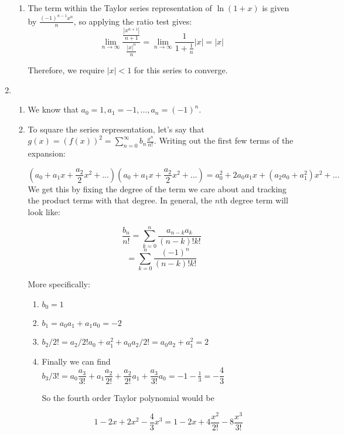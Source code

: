 \begin{enumerate}
\begin{enumerate}
                \item The term within the Taylor series representation of $\ln(1+x)$ is given by $\frac{(-1)^{n-1}x^n}{n}$, so applying the ratio test gives:
                \[\lim_{n\to\infty}\frac{\frac{|x^{n+1}|}{n+1}}{\frac{|x|^n}{n}} = \lim_{n\to\infty}\frac{1}{1+\frac{1}{n}}|x| = |x|\]
                
                Therefore, we require $|x| < 1$ for this series to converge.
            \end{enumerate}
            
            \item 
            \begin{enumerate}
                \item We know that $a_0 = 1, a_1 = -1, ..., a_n = (-1)^n$.
                
                
                \item To square the series representation, let's say that $g(x) = (f(x))^2=\sum_{n=0}^\infty b_n \frac{x^n}{n!}$. Writing out the first few terms of the expansion:

                \[(a_0 + a_1x + \frac{a_2}{2}x^2 +...)(a_0 + a_1x + \frac{a_2}{2}x^2 +...) = a_0^2 + 2a_0a_1x + (a_2a_0 +a_1^2)x^2 + ...\]
                We get this by fixing the degree of the term we care about and tracking the product terms with that degree. 
                In general, the $n$th degree term will look like:

                \[\frac{b_n}{n!} = \sum_{k=0}^n \frac{a_{n-k}a_k}{(n-k)!k!}\]
                \[ = \sum_{k=0}^n \frac{(-1)^n}{(n-k)!k!}\]

                
                More specifically:

                \begin{enumerate}
                    \item $b_0 = 1$
                    \item $b_1 = a_0a_1 + a_1 a_0 = -2$
                    \item $b_2/2! = a_2/2!a_0 + a_1^2 + a_0a_2/2! = a_0a_2 + a_1^2 = 2$
                    \item Finally we can find $b_3/3! = a_0\dfrac{a_3}{3!} + a_1 \dfrac{a_2}{2!} + \dfrac{a_2}{2!}a_1 + \dfrac{a_3}{3!}a_0 = -1-\frac{1}{3} = -\dfrac{4}{3}$

                    So the fourth order Taylor polynomial would be

                    \[1 -2x +2x^2 -\dfrac{4}{3}x^3 = 1 -2x +4\frac{x^2}{2!} -8\dfrac{x^3}{3!}\]


\end{enumerate}
\end{enumerate}
\end{enumerate}
